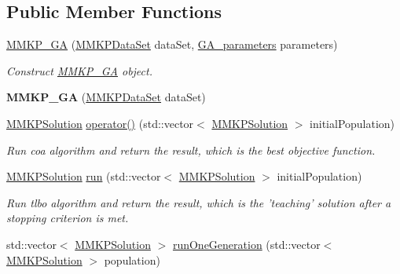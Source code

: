 \subsection*{Public Member Functions}
\begin{DoxyCompactItemize}
\item 
\hyperlink{class_m_m_k_p___g_a_a970a4006be6cc6945c29b9bb4ff3dc31}{M\+M\+K\+P\+\_\+\+G\+A} (\hyperlink{class_m_m_k_p_data_set}{M\+M\+K\+P\+Data\+Set} data\+Set, \hyperlink{class_g_a__parameters}{G\+A\+\_\+parameters} parameters)
\begin{DoxyCompactList}\small\item\em Construct \hyperlink{class_m_m_k_p___g_a}{M\+M\+K\+P\+\_\+\+G\+A} object. \end{DoxyCompactList}\item 
\hypertarget{class_m_m_k_p___g_a_ad3df4704df221933c8e2377dd765ed5f}{{\bfseries M\+M\+K\+P\+\_\+\+G\+A} (\hyperlink{class_m_m_k_p_data_set}{M\+M\+K\+P\+Data\+Set} data\+Set)}\label{class_m_m_k_p___g_a_ad3df4704df221933c8e2377dd765ed5f}

\item 
\hypertarget{class_m_m_k_p___g_a_aeeda12afb45c59bd18f9761a75765331}{\hyperlink{class_m_m_k_p_solution}{M\+M\+K\+P\+Solution} \hyperlink{class_m_m_k_p___g_a_aeeda12afb45c59bd18f9761a75765331}{operator()} (std\+::vector$<$ \hyperlink{class_m_m_k_p_solution}{M\+M\+K\+P\+Solution} $>$ initial\+Population)}\label{class_m_m_k_p___g_a_aeeda12afb45c59bd18f9761a75765331}

\begin{DoxyCompactList}\small\item\em Run coa algorithm and return the result, which is the best objective function. \end{DoxyCompactList}\item 
\hypertarget{class_m_m_k_p___g_a_a64990a8141476468684581138ee966ec}{\hyperlink{class_m_m_k_p_solution}{M\+M\+K\+P\+Solution} \hyperlink{class_m_m_k_p___g_a_a64990a8141476468684581138ee966ec}{run} (std\+::vector$<$ \hyperlink{class_m_m_k_p_solution}{M\+M\+K\+P\+Solution} $>$ initial\+Population)}\label{class_m_m_k_p___g_a_a64990a8141476468684581138ee966ec}

\begin{DoxyCompactList}\small\item\em Run tlbo algorithm and return the result, which is the 'teaching' solution after a stopping criterion is met. \end{DoxyCompactList}\item 
\hypertarget{class_m_m_k_p___g_a_a3b2479268204cedada4d245c9ae23170}{std\+::vector$<$ \hyperlink{class_m_m_k_p_solution}{M\+M\+K\+P\+Solution} $>$ \hyperlink{class_m_m_k_p___g_a_a3b2479268204cedada4d245c9ae23170}{run\+One\+Generation} (std\+::vector$<$ \hyperlink{class_m_m_k_p_solution}{M\+M\+K\+P\+Solution} $>$ population)}\label{class_m_m_k_p___g_a_a3b2479268204cedada4d245c9ae23170}


\end{DoxyCompactItemize}
